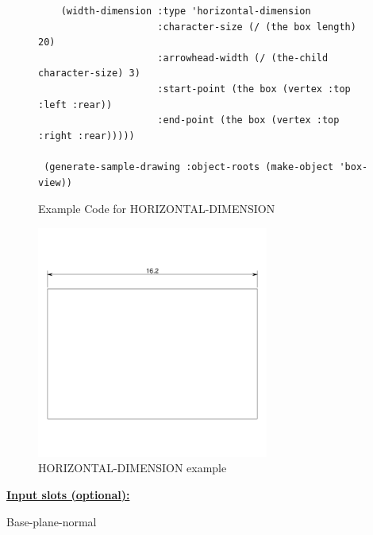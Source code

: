 \documentclass [11pt]{book}
\begin{document}
\begin{itemize}
\begin{figure}
\begin{lrbox}{\boxedverb}
\begin{minipage}{\linewidth}
{\begin{verbatim}
    (width-dimension :type 'horizontal-dimension
                     :character-size (/ (the box length) 20)
                     :arrowhead-width (/ (the-child character-size) 3)
                     :start-point (the box (vertex :top :left :rear))
                     :end-point (the box (vertex :top :right :rear)))))

 (generate-sample-drawing :object-roots (make-object 'box-view)) 
\end{verbatim}}
\end{minipage}
\end{lrbox}
\fbox{\usebox{\boxedverb}}

\caption{Example Code for HORIZONTAL-DIMENSION}

\label{fig:example-code-HORIZONTAL-DIMENSION}

\end{figure}

\begin{figure}
\begin{center}
\includegraphics[width=3in,height=3in]{../images/example-HORIZONTAL-DIMENSION.pdf}
\end{center}

\caption{HORIZONTAL-DIMENSION example}

\label{fig:HORIZONTAL-DIMENSION}

\end{figure}





\textbf{
\underline{Input slots (optional):}}

\begin{description}

\item [Base-plane-normal]


\end{description}
\end{itemize}
\end{document}

